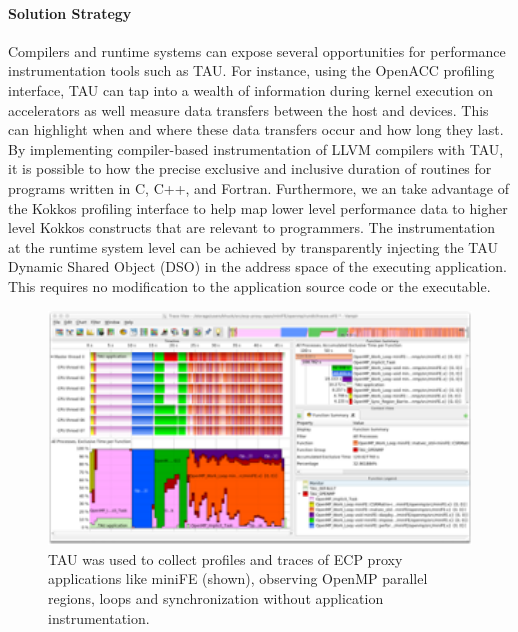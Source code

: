 \paragraph{Solution Strategy} Compilers and runtime systems can expose several opportunities for performance instrumentation tools such as TAU.  For instance, using the OpenACC profiling interface, TAU can tap into a wealth of information during kernel execution on accelerators as well measure data transfers between the host and devices. This can highlight when and where these data transfers occur and how long they last.  By implementing compiler-based instrumentation of LLVM compilers with TAU, it is possible to how the precise exclusive and inclusive duration of routines for programs written in C, C++, and Fortran.  Furthermore, we an take advantage of the Kokkos profiling interface to help map lower level performance data to higher level Kokkos constructs that are relevant to programmers. The instrumentation at the runtime system level can be achieved by transparently injecting the TAU Dynamic Shared Object (DSO) in the address space of the executing application. This requires no modification to the application source code or the executable. 

\begin{figure}[htb]
\centering
\includegraphics[width=6in]{projects/2.3.2-Tools/2.3.2.10-PROTEAS-YTUNE/miniFE_openmp_tau.png}
\caption{TAU was used to collect profiles and traces of ECP proxy applications like miniFE (shown), observing OpenMP parallel regions, loops and synchronization without application instrumentation.}
\label{figure:tau}
\end{figure}

